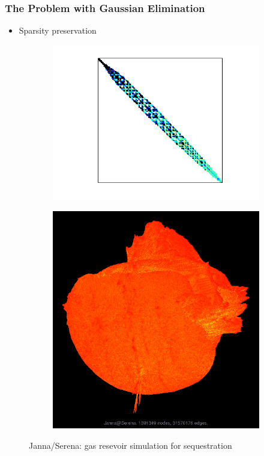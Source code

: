 \documentclass[t,12pt,numbers,fleqn]{beamer}
\begin{document}
\begin{frame}
\frametitle{The Problem with Gaussian Elimination}

\begin{itemize}
\item Sparsity preservation
\end{itemize}

\begin{figure}[h]
  \centering
  \begin{subfigure}[b]{0.5\textwidth}
    \centering
    \includegraphics[width=\textwidth,trim={2cm 1.5cm 2cm 1cm},clip]{figures/Serena}
  \end{subfigure}
  \begin{subfigure}[b]{0.37\textwidth}
    \centering
    \includegraphics[width=\textwidth]{figures/Serena_graph}
  \end{subfigure}
  \caption*{Janna/Serena: gas resevoir simulation for 
    sequestration}
  \label{fig:Serena}
\end{figure}

\end{frame}
\end{document}
